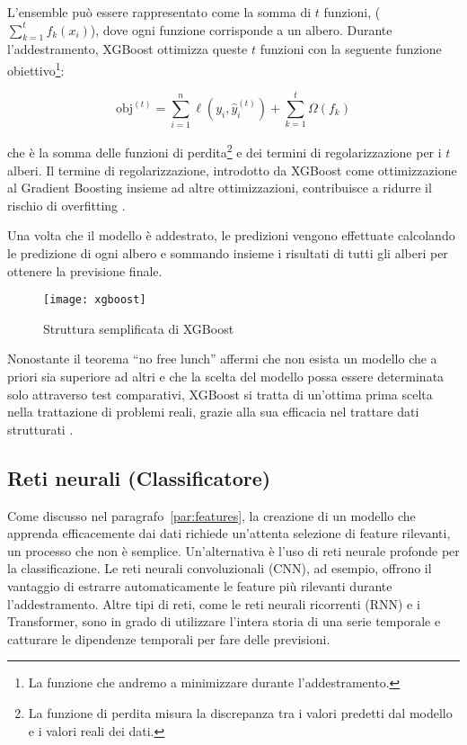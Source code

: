 L'ensemble può essere rappresentato come la somma di $t$ funzioni,
($\sum_{k=1}^{t}f_k(x_i)$), dove ogni funzione corrisponde a un albero.
Durante l'addestramento, XGBoost ottimizza queste $t$ funzioni con la seguente
funzione obiettivo\footnote{La funzione che andremo a minimizzare durante
l'addestramento.}:

$$\text{obj}^{(t)}=\displaystyle\sum_{i=1}^{n}\ell(y_i,\hat{y}_i^{(t)})+\displaystyle\sum_{k=1}^{t}\Omega(f_k)$$

che è la somma delle funzioni di perdita\footnote{La funzione di perdita
misura la discrepanza tra i valori predetti dal modello e i valori reali dei
dati.} e dei termini di regolarizzazione per i $t$ alberi. Il termine di
regolarizzazione, introdotto da XGBoost come ottimizzazione al Gradient
Boosting insieme ad altre ottimizzazioni, contribuisce a ridurre il rischio di
overfitting \cite{chen2016}. 

Una volta che il modello è addestrato, le predizioni vengono effettuate
calcolando le predizione di ogni albero e sommando insieme i risultati di
tutti gli alberi per ottenere la previsione finale.

\begin{figure}[!ht]
    \centering
    \texttt{[image: xgboost]}
    \caption{Struttura semplificata di XGBoost \protect\cite{guo2020}}
    \label{fig:xgboost}
\end{figure}

Nonostante il teorema ``no free lunch'' affermi che non esista un modello che
a priori sia superiore ad altri e che la scelta del modello possa essere
determinata solo attraverso test comparativi, XGBoost si tratta di un'ottima
prima scelta nella trattazione di problemi reali, grazie alla sua efficacia
nel trattare dati strutturati \cite{shwartz2021, chen2016}.

\subsection{Reti neurali (Classificatore)}

Come discusso nel paragrafo~\ref{par:features}, la creazione di un modello che
apprenda efficacemente dai dati richiede un'attenta selezione di feature
rilevanti, un processo che non è semplice. Un'alternativa è l'uso di reti
neurale profonde per la classificazione. Le reti neurali convoluzionali (CNN),
ad esempio, offrono il vantaggio di estrarre automaticamente le feature più
rilevanti durante l'addestramento. Altre tipi di reti, come le reti neurali
ricorrenti (RNN) e i Transformer, sono in grado di utilizzare l'intera storia
di una serie temporale e catturare le dipendenze temporali per fare delle
previsioni.

